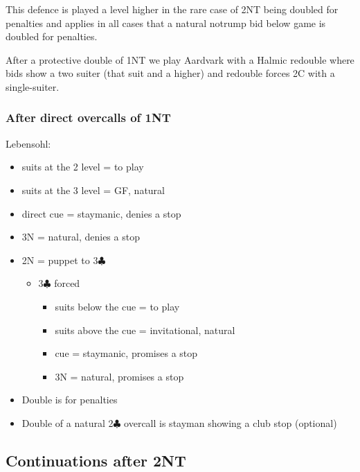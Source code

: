 \documentclass[a4paper,14pt]{extarticle}
\begin{document}
This defence is played a level higher in the rare case of 2NT being doubled for
penalties and applies in all cases that a natural notrump bid below game is doubled for
penalties.

\label{note:21}

After a protective double of 1NT we play Aardvark with a Halmic redouble where
bids show a two suiter (that suit and a higher) and redouble forces 2C with a
single-suiter.

\subsubsection{After direct overcalls of 1NT}
\label{sec:resp:lebensohl}
\label{note:13}

Lebensohl:

\begin{itemize}
\item suits at the 2 level = to play
\item suits at the 3 level = GF, natural
\item direct cue = staymanic, denies a stop
\item 3N = natural, denies a stop
\item 2N = puppet to 3$\clubsuit$
	\begin{itemize}
	\item 3$\clubsuit$ forced
		\begin{itemize}
		\item suits below the cue = to play
		\item suits above the cue = invitational, natural
		\item cue = staymanic, promises a stop
		\item 3N = natural, promises a stop
		\end{itemize}
	\end{itemize}
\item Double is for penalties
\item Double of a natural 2$\clubsuit$ overcall is stayman showing a club stop (optional)
\end{itemize}

\newpage

\subsection{Continuations after 2NT}
\label{sec:resp:2n}
\end{document}
